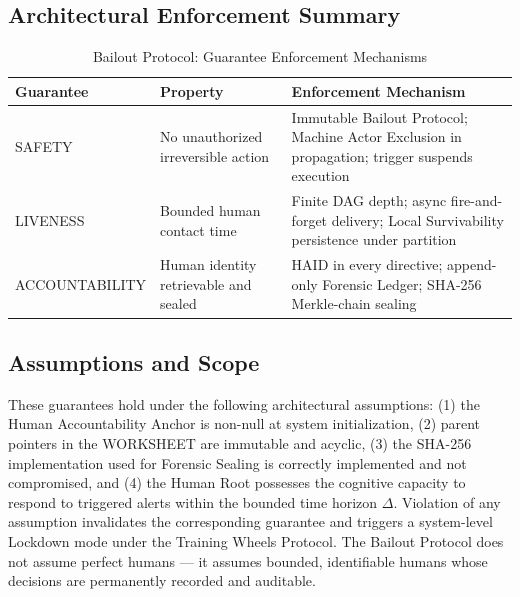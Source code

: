 \subsection{Architectural Enforcement Summary}
\begin{table}[h]
\centering
\begin{tabular}{p{2.8cm}p{3.2cm}p{6.2cm}}
\hline
\textbf{Guarantee} & \textbf{Property} & \textbf{Enforcement Mechanism} \\
\hline
SAFETY & No unauthorized irreversible action & Immutable Bailout Protocol; Machine Actor Exclusion in propagation; trigger suspends execution \\
LIVENESS & Bounded human contact time & Finite DAG depth; async fire-and-forget delivery; Local Survivability persistence under partition \\
ACCOUNTABILITY & Human identity retrievable and sealed & HAID in every directive; append-only Forensic Ledger; SHA-256 Merkle-chain sealing \\
\hline
\end{tabular}
\caption{Bailout Protocol: Guarantee Enforcement Mechanisms}
\end{table}

\subsection{Assumptions and Scope}
These guarantees hold under the following architectural assumptions: (1) the Human Accountability Anchor is non-null at system initialization, (2) parent pointers in the WORKSHEET are immutable and acyclic, (3) the SHA-256 implementation used for Forensic Sealing is correctly implemented and not compromised, and (4) the Human Root possesses the cognitive capacity to respond to triggered alerts within the bounded time horizon $\Delta$. Violation of any assumption invalidates the corresponding guarantee and triggers a system-level Lockdown mode under the Training Wheels Protocol. The Bailout Protocol does not assume perfect humans --- it assumes bounded, identifiable humans whose decisions are permanently recorded and auditable.

